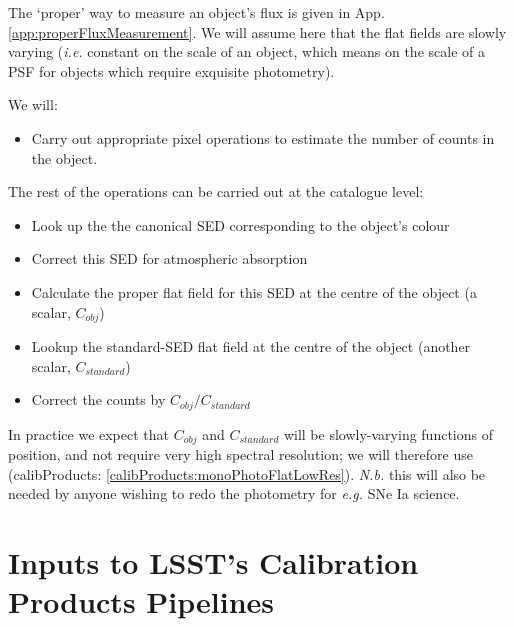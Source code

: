 \documentclass[12pt]{article}
\newcommand{\eg}{\textit{e.g.}\xspace}
\newcommand{\ie}{\textit{i.e.}\xspace}
\newcommand{\Nb}{\textit{N.b.}\xspace}
\newcommand{\outputData}[1]{(calibProducts: \ref{calibProducts:#1})}
\newcommand{\appRef}[1]{App. \ref{app:#1}}
\begin{document}
The `proper' way to measure an object's flux is given in \appRef{properFluxMeasurement}.  We will assume
here that the flat fields are slowly varying (\ie constant on the scale of an object, which means
on the scale of a PSF for objects which require exquisite photometry).

We will:
\begin{itemize}
\item Carry out appropriate pixel operations to estimate the number of counts in the object.
\end{itemize}
The rest of the operations can be carried out at the catalogue level:
\begin{itemize}
\item Look up the the canonical SED corresponding to the object's colour
\item Correct this SED for atmospheric absorption
\item Calculate the proper flat field for this SED at the centre of the object (a scalar, $C_{obj}$)
\item Lookup the standard-SED flat field at the centre of the object (another scalar, $C_{standard}$)
\item Correct the counts by $C_{obj}/C_{standard}$
\end{itemize}

In practice
we expect that  $C_{obj}$ and $C_{standard}$ will be slowly-varying functions of position, and not
require very high spectral resolution;  we will therefore use \outputData{monoPhotoFlatLowRes}.  \Nb
this will also be needed by anyone wishing to redo the photometry for \eg SNe Ia science.


\appendix

\section{Inputs to LSST's Calibration Products Pipelines}
\label{sec:calibrationInputDatasets}
\end{document}
